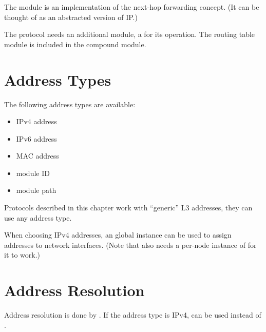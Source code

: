 The  module is an implementation of the next-hop
forwarding concept. (It can be thought of as an abstracted version of IP.)

The protocol needs an additional module, a  for its
operation. The routing table module is included in the
 compound module.


\section{Address Types}
\label{sec:networkprotocols:address-types}

The following address types are available:

\begin{itemize}
  \item IPv4 address
  \item IPv6 address
  \item MAC address
  \item module ID
  \item module path
\end{itemize}

Protocols described in this chapter work with ``generic'' L3 addresses,
they can use any address type.

When choosing IPv4 addresses, an  global
instance can be used to assign addresses to network interfaces. (Note that
 also needs a per-node instance
of  for it to work.)

\section{Address Resolution}
\label{sec:networkprotocols:address-resolution}

Address resolution is done by .
If the address type is IPv4,  can be used instead of
.




\fi


